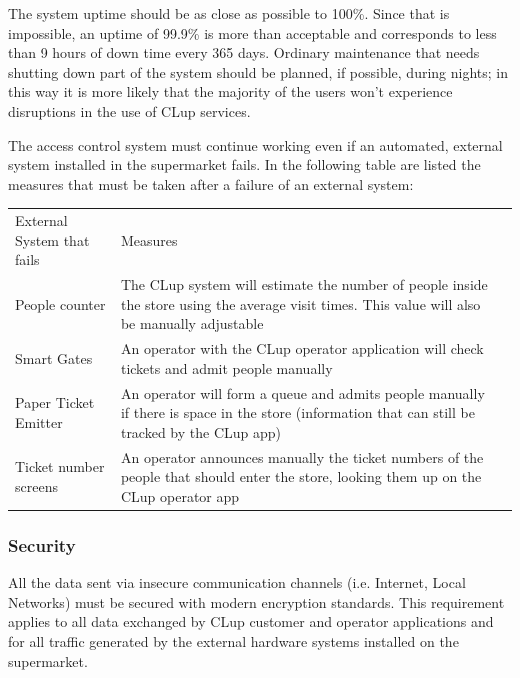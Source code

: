 \smallskip

The system uptime should be as close as possible to 100\%. Since that is impossible, an uptime of 99.9\% is more than acceptable and corresponds to less than 9 hours of down time every 365 days.
Ordinary maintenance that needs shutting down part of the system should be planned, if possible, during nights; in this way it is more likely that the majority of the users won't experience disruptions in the use of CLup services.

\smallskip

The access control system must continue working even if an automated, external system installed in the supermarket fails. In the following table are listed the measures that must be taken after a failure of an external system:
\smallskip

\begin{tabular}{C{5cm}L{10.0cm}C{2.0cm}}
    External System that fails & Measures                                                                                                                                        \\
    People counter             & The CLup system will estimate the number of people inside the store using the average visit times. This value will also be manually adjustable  \\
    Smart Gates                & An operator with the CLup operator application will check tickets and admit people manually                                                     \\
    Paper Ticket Emitter       & An operator will form a queue and admits people manually if there is space in the store (information that can still be tracked by the CLup app) \\
    Ticket number screens      & An operator announces manually the ticket numbers of the people that should enter the store, looking them up on the CLup operator app           \\
\end{tabular}
\subsubsection{Security}
All the data sent via insecure communication channels (i.e. Internet, Local Networks) must be secured with modern encryption standards. This requirement applies to all data exchanged by CLup customer and operator applications and for all traffic generated by the external hardware systems installed on the supermarket.


